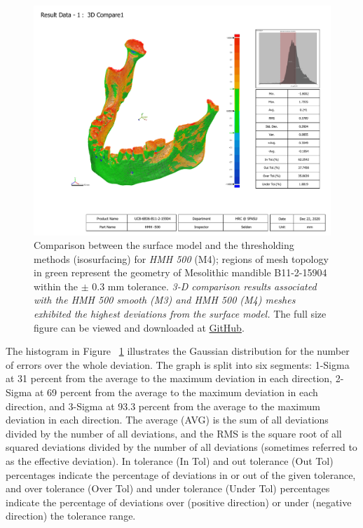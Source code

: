 \documentclass[review]{elsarticle}
\begin{document}
\begin{figure}[ht]\centering
\includegraphics[width=\linewidth]{fig3.pdf}
\caption{Comparison between the surface model and the thresholding methods (isosurfacing) for \textit{HMH 500} (M4); regions of mesh topology in green represent the geometry of Mesolithic mandible B11-2-15904 within the $\pm$ 0.3 mm tolerance. \textit{3-D comparison results associated with the HMH 500 smooth (M3) and HMH 500 (M4) meshes exhibited the highest deviations from the surface model.} The full size figure can be viewed and downloaded at \href{https://github.com/aksel-blaise/cai.mandible/blob/main/figures/fig3.pdf}{GitHub}.}
\label{fig:Fig3}
\end{figure}

The histogram in Figure ~\ref{fig:Fig3} illustrates the Gaussian distribution for the number of errors over the whole deviation. The graph is split into six segments: 1-Sigma at 31 percent from the average to the maximum deviation in each direction, 2-Sigma at 69 percent from the average to the maximum deviation in each direction, and 3-Sigma at 93.3 percent from the average to the maximum deviation in each direction. The average (AVG) is the sum of all deviations divided by the number of all deviations, and the RMS is the square root of all squared deviations divided by the number of all deviations (sometimes referred to as the effective deviation). In tolerance (In Tol) and out tolerance (Out Tol) percentages indicate the percentage of deviations in or out of the given tolerance, and over tolerance (Over Tol) and under tolerance (Under Tol) percentages indicate the percentage of deviations over (positive direction) or under (negative direction) the tolerance range. 
\end{document}
